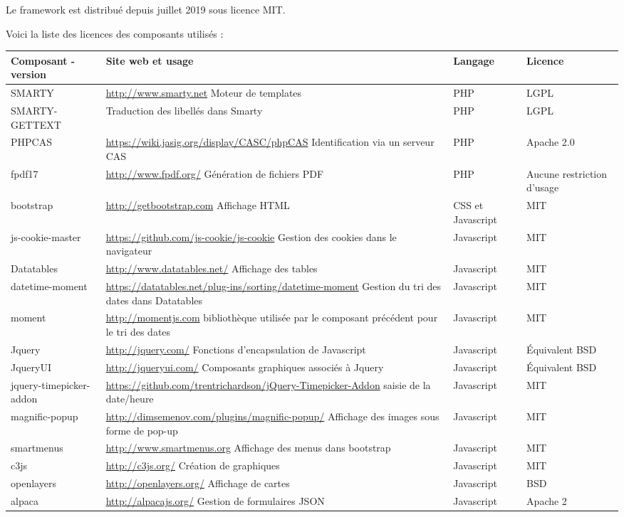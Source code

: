 Le framework est distribué depuis juillet 2019 sous licence MIT.

Voici la liste des licences des composants utilisés :


\begin{longtable}{|>{\raggedright\arraybackslash}p{3cm}|p{6cm}|>{\raggedright\arraybackslash}p{1.5cm}|>{\raggedright\arraybackslash}p{1.5cm}|}
\hline
\textbf{Composant - version} & \textbf{Site web et usage} & \textbf{Langage} & \textbf{Licence} \\
\hline
\endhead
\hline
SMARTY & \url{http://www.smarty.net} Moteur de templates & PHP & LGPL \\
\hline
SMARTY-GETTEXT & Traduction des libellés dans Smarty & PHP & LGPL \\
\hline


PHPCAS & \url{https://wiki.jasig.org/display/CASC/phpCAS} Identification via un serveur CAS & PHP & Apache 2.0\\
\hline
fpdf17 & \url{http://www.fpdf.org/} Génération de fichiers PDF & PHP & Aucune restriction d'usage\\
\hline

bootstrap & \url{http://getbootstrap.com} Affichage HTML & CSS et Javascript &  MIT\\
\hline
js-cookie-master & \url{https://github.com/js-cookie/js-cookie} Gestion des cookies dans le navigateur & Javascript & MIT \\
\hline
Datatables & \url{http://www.datatables.net/} Affichage des tables & Javascript & MIT \\
\hline
datetime-moment & \url{https://datatables.net/plug-ins/sorting/datetime-moment} Gestion du tri des dates dans Datatables & Javascript & MIT\\
\hline
moment & \url{http://momentjs.com} bibliothèque utilisée par le composant précédent pour le tri des dates & Javascript & MIT\\
\hline
Jquery & \url{http://jquery.com/} Fonctions d'encapsulation de Javascript & Javascript & Équivalent BSD \\
\hline
JqueryUI & \url{http://jqueryui.com/} Composants graphiques associés à Jquery & Javascript & Équivalent BSD \\
\hline
jquery-timepicker-addon & \url{https://github.com/trentrichardson/jQuery-Timepicker-Addon} saisie de la date/heure & Javascript & MIT\\
\hline
magnific-popup & \url{http://dimsemenov.com/plugins/magnific-popup/} Affichage des images sous forme de pop-up & Javascript & MIT \\
\hline
smartmenus & \url{http://www.smartmenus.org} Affichage des menus dans bootstrap & Javascript & MIT\\
\hline
c3js & \url{http://c3js.org/} Création de graphiques & Javascript & MIT \\
\hline
openlayers & \url{http://openlayers.org/} Affichage de cartes & Javascript & BSD\\
\hline
alpaca & \url{http://alpacajs.org/} Gestion de formulaires JSON & Javascript & Apache 2\\
\hline


\end{longtable}

